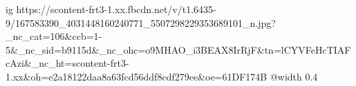  
 
 
 
 

\ifcmt
  ig https://scontent-frt3-1.xx.fbcdn.net/v/t1.6435-9/167583390_4031448160240771_5507298229353689101_n.jpg?_nc_cat=106&ccb=1-5&_nc_sid=b9115d&_nc_ohc=o9MHAO_i3BEAX8IrRjF&tn=lCYVFeHcTIAFcAzi&_nc_ht=scontent-frt3-1.xx&oh=e2a18122daa8a63fcd56ddf8cdf279ee&oe=61DF174B
  @width 0.4
\fi
